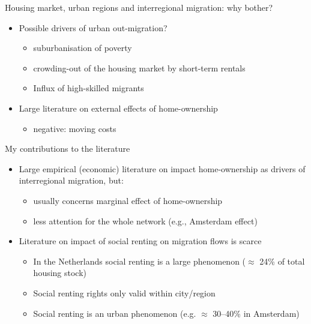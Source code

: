 \documentclass{beamer}
\begin{document}
\begin{frame}{Housing market, urban regions and interregional migration: why bother?}
  \begin{itemize}
	\item Possible drivers of urban out-migration?
	  \begin{itemize}
		\item \alert{suburbanisation} of poverty \citep{hochstenbach2018gentrification}
		\item \alert{crowding-out} of the housing market by short-term rentals
		  \citep{koster2021short}
		\item \alert{Influx} of high-skilled migrants
		  \citep{beckers2019residential}\newline \pause
\end{itemize}
   		\item Large literature on \alert{external} effects of home-ownership \citep{dietz2003social}
   		\begin{itemize}
   			\item \alert{negative}: moving costs \citep{oswald1996conjecture,oswald1999housing}
   		\end{itemize}
  \end{itemize}
\end{frame}



\begin{frame}{My contributions to the literature}
  \begin{itemize}
  \item Large empirical (economic) literature on impact home-ownership as drivers of interregional migration, but:
    \begin{itemize}
    \item usually concerns \alert{marginal} effect of home-ownership
    \item less attention for the whole \alert{network} (e.g., Amsterdam effect)\newline
    \end{itemize}
  \item Literature on impact of social renting on migration flows is
    scarce \footnotesize{\citep{de2009homeownership} }
	\begin{itemize}
        \item In the Netherlands social renting is a large phenomenon
          ($\approx$ 24\% of total housing stock)
        \item Social renting rights only valid \alert{within} city/region
        \item Social renting is an \alert{urban} phenomenon (e.g. $\approx$
          30--40\% in Amsterdam) 
        \end{itemize}
\end{itemize}
\end{frame}
\end{document}
